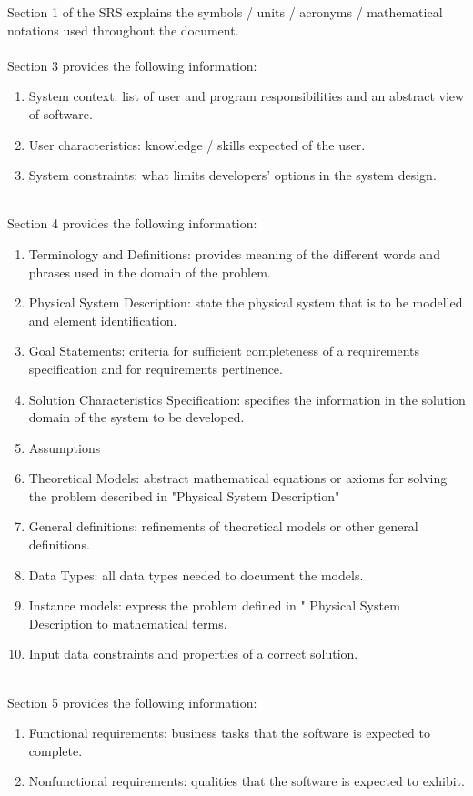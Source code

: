 \documentclass[12pt]{article}
\begin{document}
Section 1 of the SRS explains the symbols / units / acronyms / mathematical notations used throughout the document.\\
\\
  Section 3 provides the following information:
     \begin{enumerate}
    \item{System context: list of user and program responsibilities and an abstract view of software.}
    \item{User characteristics: knowledge / skills expected of the user.}
    \item{System constraints: what limits developers' options in the system design.}
  \end{enumerate}
  \\
  Section 4 provides the following information:
    \begin{enumerate}
    \item{Terminology and Definitions: provides meaning of the different words and phrases used in the domain of the problem.}
    \item{Physical System Description: state the physical system that is to be modelled and element identification.}
    \item{Goal Statements: criteria for sufficient completeness of a requirements specification and for requirements pertinence.}
    \item{Solution Characteristics Specification: specifies the information in the solution domain of the system to be developed.}
    \item{Assumptions}
    \item{Theoretical Models: abstract mathematical equations or axioms for solving the problem described in "Physical System Description"}
    \item{General definitions: refinements of theoretical models or other general definitions.}
    \item{Data Types: all data types needed to document the models.}
    \item{Instance models: express the problem defined in " Physical System Description to mathematical terms.}
     \item{Input data constraints and properties of a correct solution.}
  \end{enumerate}
  \\
  Section 5 provides the following information:
  \begin{enumerate}
    \item{Functional requirements: business tasks that the software is expected to complete.}
    \item{Nonfunctional requirements: qualities that the software is expected to exhibit.}
  \end{enumerate}
\end{document}
